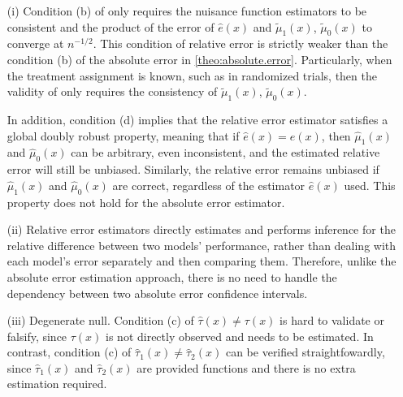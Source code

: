 \documentclass[twoside]{article}
\newcommand{\1}{{\mathbbm{1}}}
\begin{document}
\begin{itemize}
    \item [(i)] Condition (b) of  only requires the nuisance function estimators to be consistent and the product of the error of $\hat{e}(x)$ and $\tilde{\mu}_{1}(x)$, $\tilde{\mu}_{0}(x)$ to converge at $n^{-1/2}$.
    This condition of relative error is strictly weaker than the condition (b) of the absolute error in \cref{theo:absolute.error}.
    Particularly, when the treatment assignment is known, such as in randomized trials, then the validity of  only requires the consistency of $\tilde{\mu}_{1}(x)$, $\tilde{\mu}_{0}(x)$.


    In addition, condition (d) implies that the relative error estimator satisfies a global doubly robust property, meaning that if $\hat{e}(x) = e(x)$, then $\hat{\mu}_1(x)$ and $\hat{\mu}_0(x)$ can be arbitrary, even inconsistent, and the estimated relative error will still be unbiased. Similarly, the relative error remains unbiased if $\hat{\mu}_1(x)$ and $\hat{\mu}_0(x)$ are correct, regardless of the estimator $\hat{e}(x)$ used.
    This property does not hold for the absolute error estimator.

    
    \item [(ii)] Relative error estimators directly estimates and performs inference for the relative difference between two models' performance, rather than dealing with each model's error separately and then comparing them. 
    Therefore, unlike the absolute error estimation approach, there is no need to handle the dependency between two absolute error confidence intervals.
    
    \item [(iii)] Degenerate null. 
    Condition (c) of  $\hat{\tau}(x) \neq \tau(x)$ is hard to validate or falsify, since $\tau(x)$ is not directly observed and needs to be estimated.
    In contrast, condition (c) of  $\hat{\tau}_1(x) \neq \hat{\tau}_2(x)$ can be verified straightfowardly, since $\hat{\tau}_1(x)$ and $\hat{\tau}_2(x)$ are provided functions and there is no extra estimation required.



\end{itemize}
\end{document}

